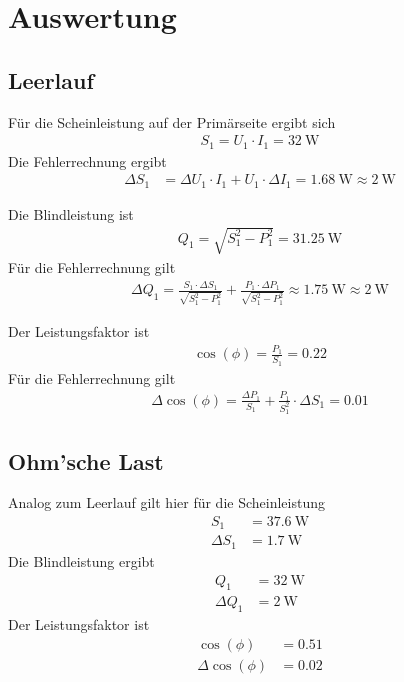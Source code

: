 \documentclass{article}
\newcommand{\W}{\text{W}}
\begin{document}
\section{Auswertung}

\subsection{Leerlauf}
Für die Scheinleistung auf der Primärseite ergibt sich
\begin{align*}
S_1 = U_1\cdot I_1 = 32~\text{W}
\end{align*}
Die Fehlerrechnung ergibt
\begin{align*}
\Delta S_1 &= \Delta U_1\cdot I_1 + U_1\cdot \Delta I_1 = 1.68~\W \approx 2~\W
\end{align*}

Die Blindleistung ist
\begin{align*}
Q_1 = \sqrt{S_1^2 - P_1^2} = 31.25~\W
\end{align*}
Für die Fehlerrechnung gilt
\begin{align*}
\Delta Q_1 = \frac{S_1\cdot \Delta S_1}{\sqrt{S_1^2-P_1^2}} + \frac{P_1\cdot \Delta P_1}{\sqrt{S_1^2-P_1^2}} \approx 1.75~\W \approx 2~\W
\end{align*}

Der Leistungsfaktor ist
\begin{align*}
\cos(\phi) = \frac{P_1}{S_1} = 0.22
\end{align*}
Für die Fehlerrechnung gilt
\begin{align*}
\Delta\cos(\phi) = \frac{\Delta P_1}{S_1} + \frac{P_1}{S_1^2}\cdot \Delta S_1 = 0.01
\end{align*}

\subsection{Ohm'sche Last}

Analog zum Leerlauf gilt hier für die Scheinleistung
\begin{align*}
S_1 &= 37.6~\W \\
\Delta S_1 &= 1.7~\W
\end{align*}
Die Blindleistung ergibt
\begin{align*}
Q_1 &= 32~\W \\
\Delta Q_1 &= 2~\W
\end{align*}
Der Leistungsfaktor ist
\begin{align*}
\cos(\phi) &= 0.51 \\
\Delta \cos(\phi) &= 0.02
\end{align*}
\end{document}

